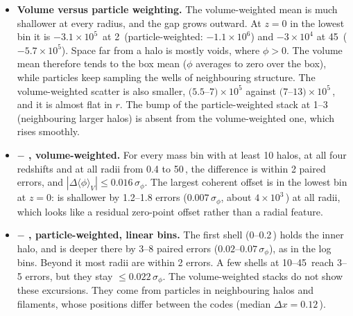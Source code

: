 \begin{itemize}
\item \textbf{Volume versus particle weighting.} The volume-weighted mean is much shallower at every radius, and the
gap grows outward. At $z=0$ in the lowest bin it is $-3.1\times10^5$\,\kms{} at 2\,\Mpch{} (particle-weighted:
$-1.1\times10^6$) and $-3\times10^4$ at 45\,\Mpch{} ($-5.7\times10^5$). Space far from a halo is mostly voids, where
$\phi > 0$. The volume mean therefore tends to the box mean ($\phi$ averages to zero over the box), while particles
keep sampling the wells of neighbouring structure. The volume-weighted scatter is also smaller, $(5.5$--$7)\times10^5$
against $(7$--$13)\times10^5$\,\kms, and it is almost flat in $r$. The bump of the particle-weighted stack at
1--3\,\Mpch{} (neighbouring larger halos) is absent from the volume-weighted one, which rises smoothly.
\item \textbf{\pkd{} $-$ \gad{}, volume-weighted.} For every mass bin with at least 10 halos, at all four redshifts
and at all radii from 0.4 to 50\,\Mpch, the difference is within 2 paired errors, and $|\Delta\langle\phi\rangle_V|
\le 0.016\,\sigma_\phi$. The largest coherent offset is in the lowest bin at $z=0$: \pkd{} is shallower by
1.2--1.8 errors ($0.007\,\sigma_\phi$, about $4\times10^3$\,\kms) at all radii, which looks like a residual
zero-point offset rather than a radial feature.
\item \textbf{\pkd{} $-$ \gad{}, particle-weighted, linear bins.} The first shell (0--0.2\,\Mpch) holds the inner
halo, and \pkd{} is deeper there by 3--8 paired errors ($0.02$--$0.07\,\sigma_\phi$), as in the log bins. Beyond
it most radii are within 2 errors. A few shells at 10--45\,\Mpch{} reach 3--5 errors, but they stay
$\le 0.022\,\sigma_\phi$. The volume-weighted stacks do not show these excursions. They come from particles in
neighbouring halos and filaments, whose positions differ between the codes (median $\Delta x = 0.12$\,\Mpch).
\end{itemize}


